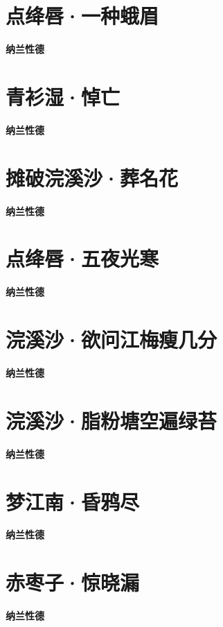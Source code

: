 \documentclass[12pt,a4paper]{ctexbook}
\begin{document}
\section{点绛唇·一种蛾眉}
\textbf{纳兰性德}\par\vspace{0.5em}

\section{青衫湿·悼亡}
\textbf{纳兰性德}\par\vspace{0.5em}

\section{摊破浣溪沙·葬名花}
\textbf{纳兰性德}\par\vspace{0.5em}

\section{点绛唇·五夜光寒}
\textbf{纳兰性德}\par\vspace{0.5em}

\section{浣溪沙·欲问江梅瘦几分}
\textbf{纳兰性德}\par\vspace{0.5em}

\section{浣溪沙·脂粉塘空遍绿苔}
\textbf{纳兰性德}\par\vspace{0.5em}

\section{梦江南·昏鸦尽}
\textbf{纳兰性德}\par\vspace{0.5em}

\section{赤枣子·惊晓漏}
\textbf{纳兰性德}\par\vspace{0.5em}
\end{document}
